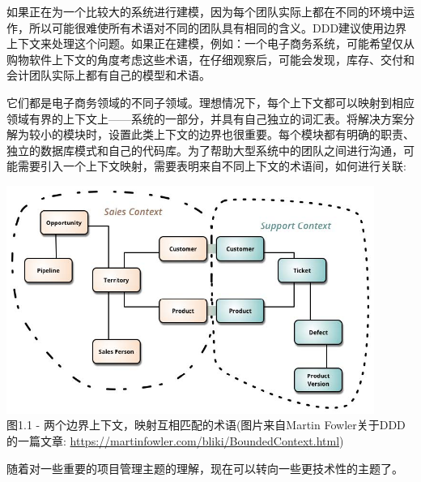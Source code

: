 如果正在为一个比较大的系统进行建模，因为每个团队实际上都在不同的环境中运作，所以可能很难使所有术语对不同的团队具有相同的含义。DDD建议使用边界上下文来处理这个问题。如果正在建模，例如：一个电子商务系统，可能希望仅从购物软件上下文的角度考虑这些术语，在仔细观察后，可能会发现，库存、交付和会计团队实际上都有自己的模型和术语。

它们都是电子商务领域的不同子领域。理想情况下，每个上下文都可以映射到相应领域有界的上下文上——系统的一部分，并具有自己独立的词汇表。将解决方案分解为较小的模块时，设置此类上下文的边界也很重要。每个模块都有明确的职责、独立的数据库模式和自己的代码库。为了帮助大型系统中的团队之间进行沟通，可能需要引入一个上下文映射，需要表明来自不同上下文的术语间，如何进行关联:

\begin{center}
\includegraphics[width=0.9\textwidth]{content/1/chapter1/images/1.jpg}\\
图1.1 - 两个边界上下文，映射互相匹配的术语(图片来自Martin Fowler关于DDD的一篇文章: \url{https://martinfowler.com/bliki/BoundedContext.html})
\end{center}

随着对一些重要的项目管理主题的理解，现在可以转向一些更技术性的主题了。








